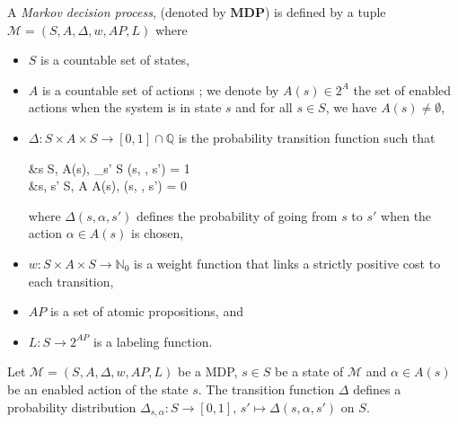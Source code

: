 \begin{definition}
	A \textit{Markov decision process}, (denoted by \textbf{MDP}) is defined by a tuple $\mathcal{M}  = (S, A, \Delta, w, AP, L)$ where
	\begin{itemize}
		\item $S$ is a countable set of states,
		\item $A$ is a countable set of actions ; we denote by $A(s) \in 2^A$  the set of enabled actions when the system is in state $s$ and for all $s \in S$,
    we have $A(s) \neq \emptyset$,
		\item $\Delta: S \times A \times S \rightarrow [0, 1] \cap \mathbb{Q}$ is the probability transition function such that
		\begin{flalign*}
			&\forall s \in S, \; \forall \alpha \in A(s), \; \sum_{s' \in S} \Delta(s, \alpha, s') = 1 \\
			 &\forall s, s' \in S, \; \forall \alpha \in A \setminus A(s), \; \Delta(s, \alpha, s') = 0
		\end{flalign*}

			where $\Delta(s, \alpha, s')$ defines the probability of going from $s$ to $s'$ when the action $\alpha \in A(s)$ is chosen,
    \item $w : S \times A \times S \rightarrow \mathbb{N}_0$ %
      is a weight function that links a strictly positive cost to each transition,
    \item $AP$ is a set of atomic propositions, and
    \item $L : S \rightarrow 2^{AP}$ is a labeling function.
	\end{itemize}
\end{definition}

\begin{property}
  Let $\mathcal{M} = (S,A, \Delta, w, AP, L)$ be a MDP, $s \in S$ be a state of $\mathcal{M}$ and $\alpha \in A(s)$ be an enabled action of the state $s$. The transition function $\Delta$ defines a probability distribution $\Delta_{s, \alpha} : S \rightarrow [0, 1], \, s' \mapsto \Delta(s, \alpha, s')$ on $S$.
\end{property}
